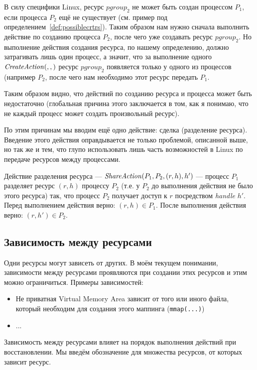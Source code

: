 В силу специфики Linux, ресурс $pgroup_2$ не может быть создан процессом $P_1$, если процесса $P_2$ ещё не существует (см. пример под определением~\ref{def:possiblecrtrs}). Таким образом нам нужно сначала выполнить действие по созданию процесса $P_2$, после чего уже создавать ресурс $pgroup_2$. Но выполнение действия создания ресурса, по нашему определению, должно затрагивать лишь один процесс, а значит, что за выполнение одного $\text{\textit{CreateAction}}(, , )$ ресурс $pgroup_2$ появляется только у одного из процессов (например $P_2$, после чего нам необходимо этот ресурс передать $P_1$.

Таким образом видно, что действий по созданию ресурса и процесса может быть недостаточно (глобальная причина этого заключается в том, как я понимаю, что не каждый процесс может создать произвольный ресурс).

По этим причинам мы вводим ещё одно действие: сделка (разделение ресурса). Введение этого действия оправдывается не только проблемой, описанной выше, но так же и тем, что глупо использовать лишь часть возможностей в Linux по передаче ресурсов между процессами.

\begin{defn}
\label{def:shareact}
Действие разделения ресурса --- $\text{\textit{ShareAction}}(P_1, P_2, (r, h), h')$ --- процесс $P_1$ разделяет ресурс $(r, h)$ процессу $P_2$ (т.е. у $P_2$ до выполнения действия не было этого ресурса) так, что процесс $P_2$ получает доступ к $r$ посредством \textit{handle} $h'$. Перед выполнением действия верно: $(r, h) \in P_1$. После выполнения действия верно: $(r, h') \in P_2$.
\end{defn}

\subsection{Зависимость между ресурсами}

Одни ресурсы могут зависеть от других. В моём текущем понимании, зависимости между ресурсами проявляются при создании этих ресурсов и этим можно ограничиться. Примеры зависимостей:

\begin{itemize}
	\item Не приватная Virtual Memory Area зависит от того или иного файла, который необходим для создания этого маппинга (\texttt{mmap(...)})
	\item ...
\end{itemize}

Зависимость между ресурсами влияет на порядок выполнения действий при восстановлении. Мы введём обозначение для множества ресурсов, от которых зависит ресурс.

